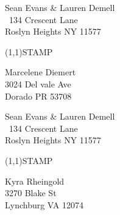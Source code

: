 \documentclass[12pt]{article}
\begin{document}
\begin{minipage}{.5\linewidth} \noindent
Sean Evans \& Lauren Demell\\\ 
134 Crescent Lane\\ 
Roslyn Heights NY 11577
\end{minipage}
\begin{minipage}{.5\linewidth \hspace{-.2in} \vspace{-.3in}}
\begin{flushright}
\framebox(1,1){STAMP}
\end{flushright}
\end{minipage}

\begin{center} \begin{Huge} \vspace*{\fill}
Marcelene Diemert\\
3024 Del vale Ave\\
Dorado PR 53708\\
\vspace{\fill} \end{Huge} \end{center}

\clearpage

\begin{minipage}{.5\linewidth} \noindent
Sean Evans \& Lauren Demell\\\ 
134 Crescent Lane\\ 
Roslyn Heights NY 11577
\end{minipage}
\begin{minipage}{.5\linewidth \hspace{-.2in} \vspace{-.3in}}
\begin{flushright}
\framebox(1,1){STAMP}
\end{flushright}
\end{minipage}

\begin{center} \begin{Huge} \vspace*{\fill}
Kyra Rheingold\\
3270 Blake St\\
Lynchburg VA 12074\\
\vspace{\fill} \end{Huge} \end{center}

\clearpage
\end{document}
